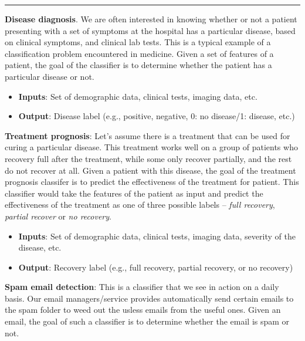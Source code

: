 \begin{boxedstuff}
    \vspace{4mm}
    \hrule
    \begin{example}
        \textbf{Disease diagnosis}. We are often interested in knowing whether or not a patient presenting with a set of symptoms at the hospital has a particular disease, based on clinical symptoms, and clinical lab tests. This is a typical example of a classification problem encountered in medicine. Given a set of features of a patient, the goal of the classifier is to determine whether the patient has a particular disease or not.
        \begin{itemize}
            \item \textbf{Inputs}: Set of demographic data, clinical tests, imaging data, etc.
            \item \textbf{Output}: Disease label (e.g., positive, negative, 0: no disease/1: disease, etc.)
        \end{itemize}
    \end{example}
    \begin{example}
        \textbf{Treatment prognosis}: Let's assume there is a treatment that can be used for curing a particular disease. This treatment works well on a group of patients who recovery full after the treatment, while some only recover partially, and the rest do not recover at all. Given a patient with this disease, the goal of the treatment prognosis classifer is to predict the effectiveness of the treatment for patient. This classifier would take the features of the patient as input and predict the effectiveness of the treatment as one of three possible labels -- \textit{full recovery}, \textit{partial recover} or \textit{no recovery}.
        \begin{itemize}
            \item \textbf{Inputs}: Set of demographic data, clinical tests, imaging data, severity of the disease, etc.
            \item \textbf{Output}: Recovery label (e.g., full recovery, partial recovery, or no recovery)
        \end{itemize}
    \end{example}
    \begin{example}
        \textbf{Spam email detection}: This is a classifier that we see in action on a daily basis. Our email managers/service provides automatically send certain emails to the spam folder to weed out the usless emails from the useful ones. Given an email, the goal of such a classifier is to determine whether the email is spam or not.

\end{example}
\end{boxedstuff}
